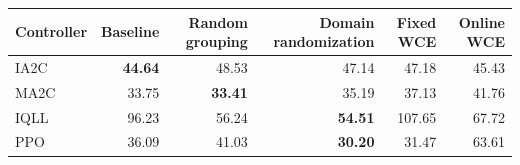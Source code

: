 \begin{tabular}{lrrrrr}
\hline
Controller & Baseline & Random grouping & Domain randomization & Fixed WCE & Online WCE \\
\hline
IA2C & \textbf{44.64} & 48.53 & 47.14 & 47.18 & 45.43 \\
MA2C & 33.75 & \textbf{33.41} & 35.19 & 37.13 & 41.76 \\
IQLL & 96.23 & 56.24 & \textbf{54.51} & 107.65 & 67.72 \\
PPO & 36.09 & 41.03 & \textbf{30.20} & 31.47 & 63.61 \\
\hline
\end{tabular}
